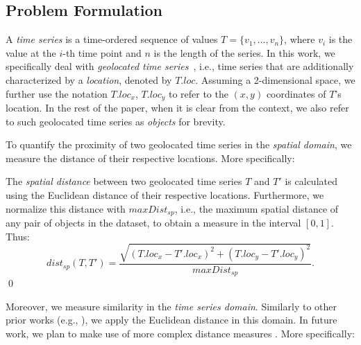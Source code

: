 \subsection{Problem Formulation}
\label{sec:problem}


A {\em time series} is a time-ordered sequence of values $T = \{v_1, \ldots, v_n\}$, where $v_i$ is the value at the $i$-th time point and $n$ is the length of the series. In this work, we specifically deal with {\em geolocated time series}~\cite{chatzig17btsr}, i.e., time series that are additionally characterized by a \emph{location}, denoted by $T.loc$. Assuming a 2-dimensional space, we further use the notation $T.loc_x$, $T.loc_y$ to refer to the $(x,y)$ coordinates of $T$'s location. In the rest of the paper, when it is clear from the context, we also refer to such geolocated time series as {\em objects} for brevity.


To quantify the proximity of two geolocated time series in the {\em spatial domain}, we measure the distance of their respective locations. More specifically:

\begin{mydefinition}
The {\em spatial distance} between two geolocated time series $T$ and $T'$ is calculated using the Euclidean distance of their respective locations. Furthermore, we normalize this distance with $maxDist_{sp}$, i.e., the maximum spatial distance of any pair of objects in the dataset, to obtain a measure in the interval $[0,1]$. Thus:
\begin{equation} \label{eq:dist_sp}
dist_{sp}(T, T') = \frac{\sqrt{(T.loc_x - T'.loc_x)^2 + (T.loc_y - T'.loc_y)^2}}{maxDist_{sp}}. 
\end{equation} \label{eq:2}
\qed
\end{mydefinition}

Moreover, we measure similarity in the {\em time series domain}. Similarly to other prior works (e.g., \cite{shieh2008kdd}), we apply the Euclidean distance in this domain. In future work, we plan to make use of more complex distance measures \cite{paparrizos2015k}.
More specifically:

